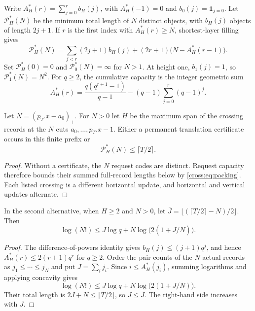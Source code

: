 Write $A_H^*(r)=\sum_{j=0}^r b_H(j)$, with $A_H^*(-1)=0$ and
$b_0(j)=\mathbf1_{j=0}$. Let $\mathcal P_H^*(N)$ be the minimum total length
of $N$ distinct objects, with $b_H(j)$ objects of length $2j+1$.
If $r$ is the first index with $A_H^*(r)\ge N$, shortest-layer filling gives
\begin{equation}
 \mathcal P_H^*(N)=\sum_{j<r}(2j+1)b_H(j)
 +(2r+1)\bigl(N-A_H^*(r-1)\bigr).\label{cross:eq:packing}
\end{equation}
Set $\mathcal P_H^*(0)=0$ and $\mathcal P_0^*(N)=\infty$ for $N>1$.
At height one, $b_1(j)=1$, so $\mathcal P_1^*(N)=N^2$.
For $q\ge2$, the cumulative capacity is the integer geometric sum
\[
 A_H^*(r)=\frac{q(q^{r+1}-1)}{q-1}
 -(q-1)\sum_{j=0}^r(q-1)^j.
\]

\begin{theorem}\label{cross:thm:work}
Let $N=(p_T.x-a_0)_+$. For $N>0$ let $H$ be the maximum span of the crossing
records at the $N$ cuts $a_0,\ldots,p_T.x-1$. Either a permanent translation
certificate occurs in this finite prefix or
\[
 \mathcal P_H^*(N)\le\lceil T/2\rceil.
\]
\end{theorem}
\begin{proof}
Without a certificate, the $N$ request codes are distinct. Request capacity
therefore bounds their summed full-record lengths below by
\eqref{cross:eq:packing}. Each listed crossing is a different horizontal update,
and horizontal and vertical updates alternate.
\end{proof}

\begin{corollary}\label{cross:cor:entropy}
In the second alternative, when $H\ge2$ and $N>0$, let
$\overline J=\lfloor(\lceil T/2\rceil-N)/2\rfloor$. Then
\begin{equation}
 \log(N!)\le\overline J\log q
       +N\log\bigl(2(1+\overline J/N)\bigr).
 \label{cross:eq:entropy}
\end{equation}
\end{corollary}
\begin{proof}
The difference-of-powers identity gives $b_H(j)\le(j+1)q^j$, and hence
$A_H^*(r)\le2(r+1)q^r$ for $q\ge2$. Order the pair counts of the $N$ actual
records as $j_1\le\cdots\le j_N$ and put $J=\sum_i j_i$. Since
$i\le A_H^*(j_i)$, summing logarithms and applying concavity gives
\[
 \log(N!)\le J\log q+N\log\bigl(2(1+J/N)\bigr).
\]
Their total length is $2J+N\le\lceil T/2\rceil$, so $J\le\overline J$.
The right-hand side increases with $J$.
\end{proof}

